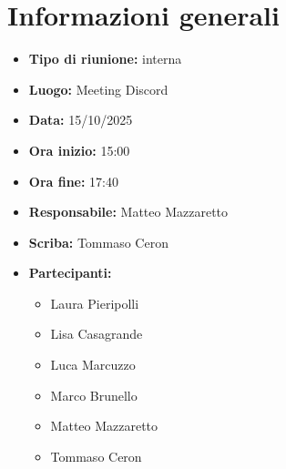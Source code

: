 \section{Informazioni generali}

\begin{itemize}
    \item \textbf{Tipo di riunione:} interna
    \item \textbf{Luogo:} Meeting Discord
    \item \textbf{Data:} 15/10/2025
    \item \textbf{Ora inizio:} 15:00
    \item \textbf{Ora fine:} 17:40
    \item \textbf{Responsabile:} Matteo Mazzaretto 
    \item \textbf{Scriba:} Tommaso Ceron
    \item \textbf{Partecipanti:}
    \begin{itemize}
        \renewcommand{\labelitemii}{--}
        \item Laura Pieripolli
        \item Lisa Casagrande
        \item Luca Marcuzzo
        \item Marco Brunello
        \item Matteo Mazzaretto
        \item Tommaso Ceron
    \end{itemize}
\end{itemize}